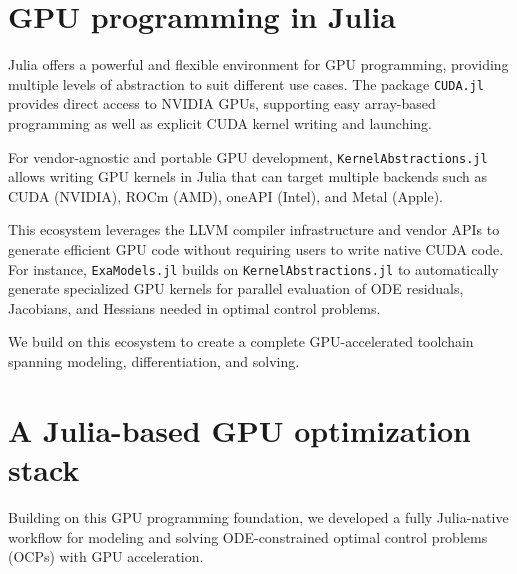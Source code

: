 \documentclass[twoside,leqno,twocolumn]{article}
\begin{document}



\section{GPU programming in Julia}

Julia offers a powerful and flexible environment for GPU programming, providing multiple levels of abstraction to suit different use cases.
The package \texttt{CUDA.jl}~\cite{besard2018juliagpu,besard2019prototyping} provides direct access to NVIDIA GPUs, supporting easy array-based programming as well as explicit CUDA kernel writing and launching.

For vendor-agnostic and portable GPU development, \texttt{KernelAbstractions.jl}~\cite{Churavy_KernelAbstractions_jl} allows writing GPU kernels in Julia that can target multiple backends such as CUDA (NVIDIA), ROCm (AMD), oneAPI (Intel), and Metal (Apple).

This ecosystem leverages the LLVM compiler infrastructure and vendor APIs to generate efficient GPU code without requiring users to write native CUDA code.
For instance, \texttt{ExaModels.jl} builds on \texttt{KernelAbstractions.jl} to automatically generate specialized GPU kernels for parallel evaluation of ODE residuals, Jacobians, and Hessians needed in optimal control problems.

We build on this ecosystem to create a complete GPU-accelerated toolchain spanning modeling, differentiation, and solving.

\section{A Julia-based GPU optimization stack}

Building on this GPU programming foundation, we developed a fully Julia-native workflow for modeling and solving ODE-constrained optimal control problems (OCPs) with GPU acceleration.
\end{document}
